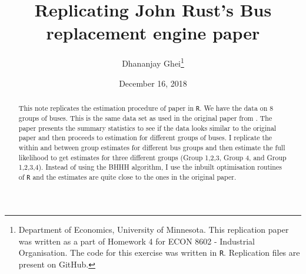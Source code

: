 \documentclass[11pt,letterpaper]{article}
\title{Replicating John Rust's Bus replacement engine paper}
\author{Dhananjay Ghei\footnote{Department of Economics, University of
    Minnesota. This replication paper was written as a part of
    Homework 4 for ECON 8602 - Industrial Organisation. The code for
    this exercise was written in \texttt{R}. Replication files are
    present on GitHub.}}  \date{December 16, 2018}
\begin{document}
\maketitle
\begin{abstract}
  This note replicates the estimation procedure of
  \citet{rust1987optimal} paper in \texttt{R}. We have the data on 8
  groups of buses. This is the same data set as used in the original
  paper from \citet{rust1987optimal}. The paper presents the summary
  statistics to see if the data looks similar to the original paper
  and then proceeds to estimation for different groups of buses. I
  replicate the within and between group estimates for different bus
  groups and then estimate the full likelihood to get estimates for
  three different groups (Group 1,2,3, Group 4, and Group
  1,2,3,4). Instead of using the BHHH algorithm, I use the inbuilt
  optimisation routines of \texttt{R} and the estimates are quite
  close to the ones in the original paper.
\end{abstract}
\newpage
\tableofcontents
\newpage
\end{document}
